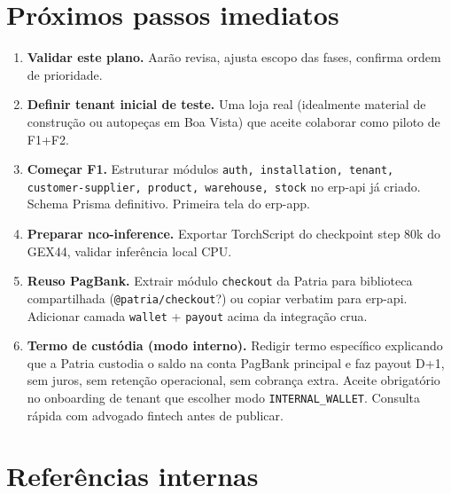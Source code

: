 \documentclass[11pt,a4paper]{article}
\begin{document}
\section{Próximos passos imediatos}

\begin{enumerate}[leftmargin=2em]
  \item \textbf{Validar este plano.} Aarão revisa, ajusta escopo das fases,
        confirma ordem de prioridade.
  \item \textbf{Definir tenant inicial de teste.} Uma loja real (idealmente
        material de construção ou autopeças em Boa Vista) que aceite
        colaborar como piloto de F1+F2.
  \item \textbf{Começar F1.} Estruturar módulos \texttt{auth, installation,
        tenant, customer-supplier, product, warehouse, stock} no erp-api
        já criado. Schema Prisma definitivo. Primeira tela do erp-app.
  \item \textbf{Preparar nco-inference.} Exportar TorchScript do checkpoint
        step 80k do GEX44, validar inferência local CPU.
  \item \textbf{Reuso PagBank.} Extrair módulo \texttt{checkout} da Patria
        para biblioteca compartilhada (\texttt{@patria/checkout}?) ou
        copiar verbatim para erp-api. Adicionar camada
        \texttt{wallet} + \texttt{payout} acima da integração crua.
  \item \textbf{Termo de custódia (modo interno).} Redigir termo
        específico explicando que a Patria custodia o saldo na conta
        PagBank principal e faz payout D+1, sem juros, sem retenção
        operacional, sem cobrança extra. Aceite obrigatório no onboarding
        de tenant que escolher modo \texttt{INTERNAL\_WALLET}. Consulta
        rápida com advogado fintech antes de publicar.
\end{enumerate}

\section*{Referências internas}
\end{document}
